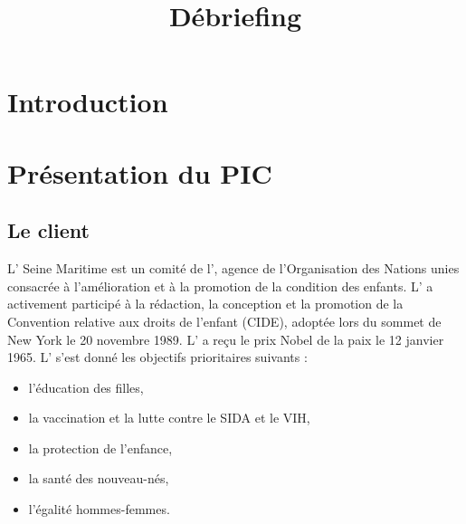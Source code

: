\documentclass[asi]{picInsa}
\title{Débriefing \CP{}}
\author{\Sergi}
\begin{document}
\couverture{}

\informationsGenerales{}
%
\begin{pagesService}
	\begin{historique}

	\end{historique}

        \begin{suiviDiffusions}

          
       
        \end{suiviDiffusions}

        \begin{signatures}
        \end{signatures}
\end{pagesService}

\tableofcontents

\setcounter{chapter}{0}

\chapter{Introduction}
\label{Introduction}





\chapter{Présentation du PIC}
\label{presentation_PIC}
\section{Le client}
L'\nomClient{} Seine Maritime est un comité de l'\nomClient{},  agence de l'Organisation des Nations unies consacrée à l'amélioration et à la promotion de la condition des enfants.  L'\nomClient{} a activement participé à la rédaction, la conception et la promotion de la Convention relative aux droits de l'enfant (CIDE), adoptée lors du sommet de New York le 20 novembre 1989. L'\nomClient{} a reçu le prix Nobel de la paix le 12 janvier 1965. L'\nomClient{} s'est donné les objectifs prioritaires suivants :
\begin{itemize}
	\item l'éducation des filles,
	\item la vaccination et la lutte contre le SIDA et le VIH,
	\item la protection de l'enfance,
	\item la santé des nouveau-nés,
	\item l'égalité hommes-femmes\vspace{0.5cm}.
\end{itemize}
\end{document}
